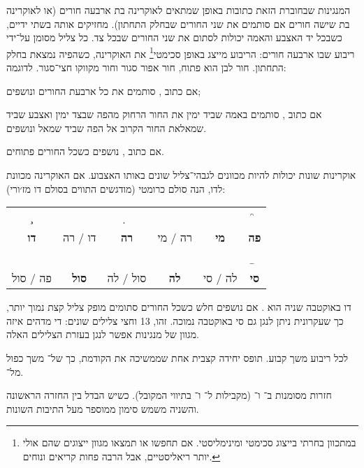 המנגינות שבחוברת הזאת כתובות באופן שמתאים לאוקרינה בת ארבעה חורים (או לאוקרינה בת שישה חורים אם סותמים את שני החורים שבחלק התחתון). מחזיקים אותה בשתי ידיים, כשבכל יד האצבע והאמה יכולות לסתום את שני החורים שבכל צד. כל צליל מסומן על־ידי ריבוע שבו ארבעה חורים: הריבוע מייצג באופן סכימטי\footnote{במתכוון בחרתי בייצוג סכימטי ומינימליסטי. אם תחפשו  או  תמצאו מגוון ייצוגים שהם אולי יותר ריאליסטיים, אבל הרבה פחות קריאים ונוחים.} את האוקרינה, כשהפיה נמצאת בחלק התחתון. חור לבן הוא פתוח, חור אפור סגור וחור מקווקו חצי־סגור. לדוגמה:
\begin{compactitem}
	\item אם כתוב \enliniatabulaturo{\c}, סותמים את כל ארבעת החורים ונושפים;
	\item אם כתוב \enliniatabulaturo{\gis}, סותמים באמה שביד ימין את החור הרחוק מהפה שבצד ימין ואצבע שביד שמאלאת החור הקרוב אל הפה שביד שמאל ונושפים.
	\item אם כתוב \enliniatabulaturo{\C}, נושפים כשכל החורים פתוחים.
\end{compactitem}

אוקרינות שונות יכולות להיות מכוונים לגבהי־צליל שונים באותו האצבוע. אם האוקרינה מכוונת לדו, הנה סולם כרומטי (מודגשים התווים בסולם דו מז׳ורי):

\begin{tabular}{cccccc}
	\c & \cis & \d & \dis & \e & \f\\
	\textbf{דו} &
	דו\symbolglyph{♯} / רה\symbolglyph{♭} &
	\textbf{רה} &
	רה\symbolglyph{♯} / מי\symbolglyph{♭} &
	\textbf{מי} &
	\textbf{פה}\\
	\fis & \g & \gis & \a & \ais & \b\\
	פה\symbolglyph{♯} / סול\symbolglyph{♭} &
	\textbf{סול} &
	סול\symbolglyph{♯} / לה\symbolglyph{♭} &
	\textbf{לה} &
	לה\symbolglyph{♯} / סי\symbolglyph{♭} &
	\textbf{סי}
\end{tabular}

דו באוקטבה שניה הוא \enliniatabulaturo{{\C}}. אם נושפים חלש כשכל החורים סתומים מופק צליל קצת נמוך יותר, כך שעקרונית ניתן לנגן גם סי באוקטבה נמוכה. זהו, 13 וחצי צלילים שונים: די מדהים איזה מגוון של מנגינות אפשר לנגן בעזרת הצלילים האלה.

לכל ריבוע משך קבוע. \enliniatabulaturo{\z} תופס יחידה קצבית אחת שממשיכה את הקודמת, כך של־\enliniatabulaturo{\mbox{\LR{\c\z}}} משך כפול מל־\enliniatabulaturo{\c}.

חזרות מסומנות ב־ ו־ (מקבילות ל־ ו־ בתיווי המקובל). כשיש הבדל בין החזרה הראשונה והשניה משמש סימון  ממוספר מעל התיבות השונות.

